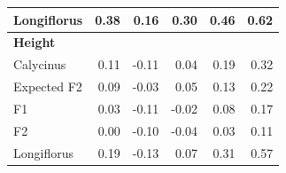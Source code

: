 \documentclass[
  letterpaper,
  DIV=11,
  numbers=noendperiod]{scrartcl}
\begin{document}
\begin{table}
\begin{tabular}[t]{l|r|r|r|r|r}
\hline
\hspace{1em}Longiflorus & 0.38 & 0.16 & 0.30 & 0.46 & 0.62\\
\hline
\multicolumn{6}{l}{\textbf{Height}}\\
\hline
\hspace{1em}Calycinus & 0.11 & -0.11 & 0.04 & 0.19 & 0.32\\
\hline
\hspace{1em}Expected F2 & 0.09 & -0.03 & 0.05 & 0.13 & 0.22\\
\hline
\hspace{1em}F1 & 0.03 & -0.11 & -0.02 & 0.08 & 0.17\\
\hline
\hspace{1em}F2 & 0.00 & -0.10 & -0.04 & 0.03 & 0.11\\
\hline
\hspace{1em}Longiflorus & 0.19 & -0.13 & 0.07 & 0.31 & 0.57\\
\hline
\end{tabular}
\end{table}
\end{document}
